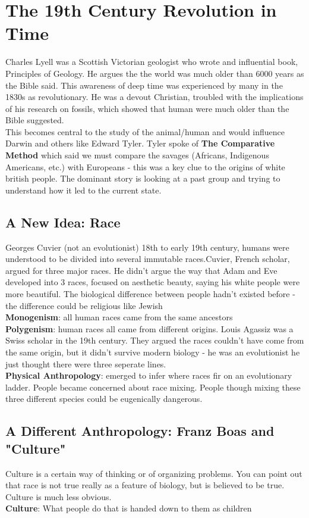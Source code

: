 \documentclass{article}
\begin{document}
\section{The 19th Century Revolution in Time}
Charles Lyell was a Scottish Victorian geologist who wrote and influential book, Principles of Geology. He argues the the world was much older than 6000 years as the Bible said. This awareness of deep time was experienced by many in the 1830s as revolutionary. He was a devout Christian, troubled with the implications of his research on fossils, which showed that human were much older than the Bible suggested. \\
This becomes central to the study of the animal/human and would influence Darwin and others like Edward Tyler. Tyler spoke of \textbf{The Comparative Method} which said we must compare the savages (Africans, Indigenous Americans, etc.) with Europeans - this was a key clue to the origins of white british people. The dominant story is looking at a past group and trying to understand how it led to the current state. 

\subsection{A New Idea: Race}
Georges Cuvier (not an evolutionist) 18th to early 19th century, humans were understood to be divided into several immutable races.Cuvier, French scholar, argued for three major races. He didn't argue the way that Adam and Eve developed into 3 races, focused on aesthetic beauty, saying his white people were more beautiful. The biological difference between people hadn't existed before - the difference could be religious like Jewish \\
\textbf{Monogenism}: all human races came from the same ancestors \\
\textbf{Polygenism}: human races all came from different origins. Louis Agassiz was a Swiss scholar in the 19th century. They argued the races couldn't have come from the same origin, but it didn't survive modern biology - he was an evolutionist he just thought there were three seperate lines. \\ 
\textbf{Physical Anthropology}: emerged to infer where races fir on an evolutionary ladder. People became concerned about race mixing. People though mixing these three different species could be eugenically dangerous.

\subsection{A Different Anthropology: Franz Boas and "Culture"}
Culture is a certain way of thinking or of organizing problems. You can point out that race is not true really as a feature of biology, but is believed to be true. Culture is much less obvious. \\
\textbf{Culture}: What people do that is handed down to them as children
\end{document}

